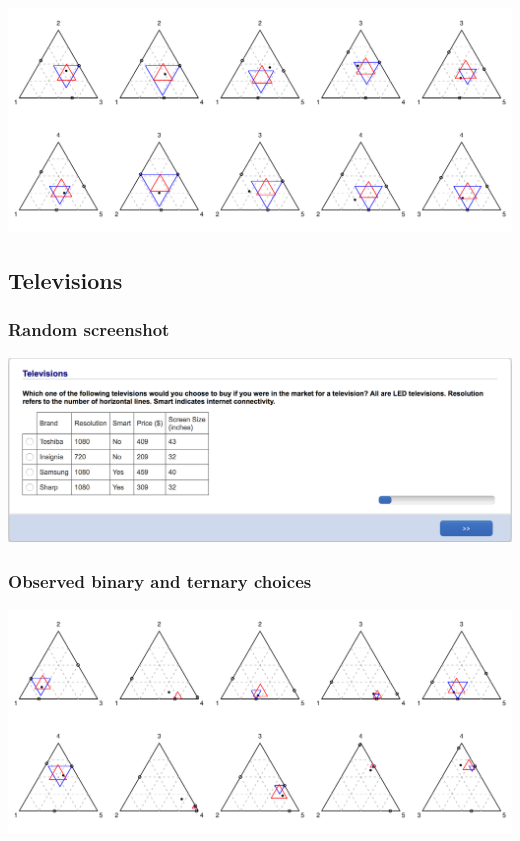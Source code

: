 \documentclass[11pt,letter]{article}
\begin{document}
\includegraphics[width=15cm]{./Population_study_data/Simplexes/Two-flight_itineraries.pdf}

\pagebreak

\subsection{Televisions}



\subsubsection*{Random screenshot}

\includegraphics[width=15cm]{Population_study_design/screenshot_Televisions.png}

\subsubsection*{Observed binary and ternary choices}

\includegraphics[width=15cm]{./Population_study_data/Simplexes/Televisions.pdf}
\end{document}
